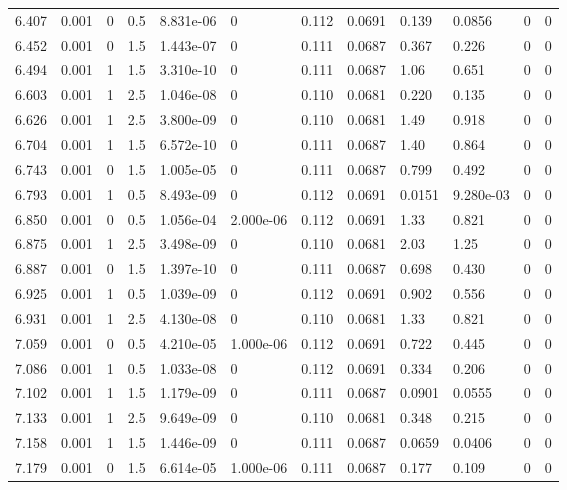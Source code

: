 \documentclass[preview]{standalone}
\begin{document}
{{{{\begin{tabular}{L{1.2cm}C{1.2cm} C{0.3cm}C{0.5cm} C{1.4cm}C{1.4cm} C{1.4cm}C{1.4cm} C{1.6cm}C{1.6cm} C{1.6cm}C{1.6cm}}
  6.407  &  0.001  & 0     & 0.5 &  8.831e-06  & 0  &  0.112&   0.0691& 0.139 & 0.0856   &  0 & 0  \\ 
  6.452  &  0.001  & 0     & 1.5 &  1.443e-07  & 0  &  0.111&   0.0687& 0.367 & 0.226   &  0 & 0  \\ 
  6.494  &  0.001  & 1     & 1.5 &  3.310e-10  & 0  &  0.111&   0.0687& 1.06 & 0.651   &  0 & 0  \\ 
  6.603  &  0.001  & 1     & 2.5 &  1.046e-08  & 0  &  0.110&   0.0681& 0.220 & 0.135   &  0 & 0  \\ 
  6.626  &  0.001  & 1     & 2.5 &  3.800e-09  & 0  &  0.110&   0.0681& 1.49 & 0.918   &  0 & 0  \\ 
  6.704  &  0.001  & 1     & 1.5 &  6.572e-10  & 0  &  0.111&   0.0687& 1.40 & 0.864   &  0 & 0  \\ 
  6.743  &  0.001  & 0     & 1.5 &  1.005e-05  & 0  &  0.111&   0.0687& 0.799 & 0.492   &  0 & 0  \\ 
  6.793  &  0.001  & 1     & 0.5 &  8.493e-09  & 0  &  0.112&   0.0691& 0.0151 & 9.280e-03   &  0 & 0  \\ 
  6.850  &  0.001  & 0     & 0.5 &  1.056e-04  & 2.000e-06  &  0.112&   0.0691& 1.33 & 0.821   &  0 & 0  \\ 
  6.875  &  0.001  & 1     & 2.5 &  3.498e-09  & 0  &  0.110&   0.0681& 2.03 & 1.25   &  0 & 0  \\ 
  6.887  &  0.001  & 0     & 1.5 &  1.397e-10  & 0  &  0.111&   0.0687& 0.698 & 0.430   &  0 & 0  \\ 
  6.925  &  0.001  & 1     & 0.5 &  1.039e-09  & 0  &  0.112&   0.0691& 0.902 & 0.556   &  0 & 0  \\ 
  6.931  &  0.001  & 1     & 2.5 &  4.130e-08  & 0  &  0.110&   0.0681& 1.33 & 0.821   &  0 & 0  \\ 
  7.059  &  0.001  & 0     & 0.5 &  4.210e-05  & 1.000e-06  &  0.112&   0.0691& 0.722 & 0.445   &  0 & 0  \\ 
  7.086  &  0.001  & 1     & 0.5 &  1.033e-08  & 0  &  0.112&   0.0691& 0.334 & 0.206   &  0 & 0  \\ 
  7.102  &  0.001  & 1     & 1.5 &  1.179e-09  & 0  &  0.111&   0.0687& 0.0901 & 0.0555   &  0 & 0  \\ 
  7.133  &  0.001  & 1     & 2.5 &  9.649e-09  & 0  &  0.110&   0.0681& 0.348 & 0.215   &  0 & 0  \\ 
  7.158  &  0.001  & 1     & 1.5 &  1.446e-09  & 0  &  0.111&   0.0687& 0.0659 & 0.0406   &  0 & 0  \\ 
  7.179  &  0.001  & 0     & 1.5 &  6.614e-05  & 1.000e-06  &  0.111&   0.0687& 0.177 & 0.109   &  0 & 0  \\ 

\end{tabular}}}}}
\end{document}
